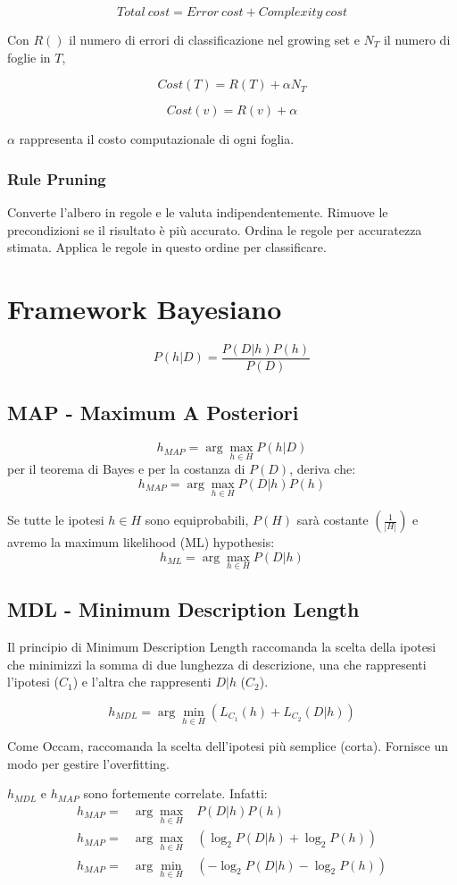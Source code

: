 \documentclass[11pt,onecolumn,a4paper,oneside]{book}
\begin{document}
$$Total~cost = Error~cost + Complexity~cost$$

Con $R()$ il numero di errori di classificazione nel growing set e $N_T$ il numero di foglie in $T$,

$$Cost(T) = R(T) + \alpha N_T$$

$$Cost(v) = R(v) + \alpha $$

$\alpha$ rappresenta il costo computazionale di ogni foglia.

\subsection{Rule Pruning}
Converte l'albero in regole e le valuta indipendentemente.
Rimuove le precondizioni se il risultato è più accurato.
Ordina le regole per accuratezza stimata. Applica le regole in questo ordine per classificare.


\chapter{Framework Bayesiano}

$$P(h|D)=\frac{P(D|h)P(h)}{P(D)}$$


\section{MAP - Maximum A Posteriori}
$$h_{MAP} = \arg\max_{h \in H} P(h|D)$$
per il teorema di Bayes e per la costanza di $P(D)$, deriva che:
$$h_{MAP} = \arg\max_{h \in H} P(D|h)P(h)$$

Se tutte le ipotesi $h \in H$ sono equiprobabili, $P(H)$ sarà costante $\left( \frac{1}{|H|} \right)$ e avremo la maximum likelihood (ML) hypothesis:
$$h_{ML} = \arg\max_{h\in H} P(D|h)$$


\section{MDL - Minimum Description Length}
Il principio di Minimum Description Length raccomanda la scelta della ipotesi che minimizzi la somma di due lunghezza di descrizione, una che rappresenti l'ipotesi ($C_1$) e l'altra che rappresenti $D|h$ ($C_2$).

$$h_{MDL} = \arg\min_{h\in H} \left( L_{C_{1}}(h) + L_{C_{2}}(D|h) \right)$$

Come Occam, raccomanda la scelta dell'ipotesi più semplice (corta).
Fornisce un modo per gestire l'overfitting.

$h_{MDL}$ e $h_{MAP}$ sono fortemente correlate.
Infatti:
\begin{eqnarray*}
h_{MAP} = & \arg\max\limits_{h \in H} & P(D|h)P(h) \\
h_{MAP} = & \arg\max\limits_{h \in H} & \left( \log_{2} P(D|h) + \log_{2} P(h) \right) \\
h_{MAP} = & \arg\min\limits_{h \in H} & \left( - \log_{2} P(D|h) - \log_{2} P(h) \right) \\
\end{eqnarray*}
\end{document}
